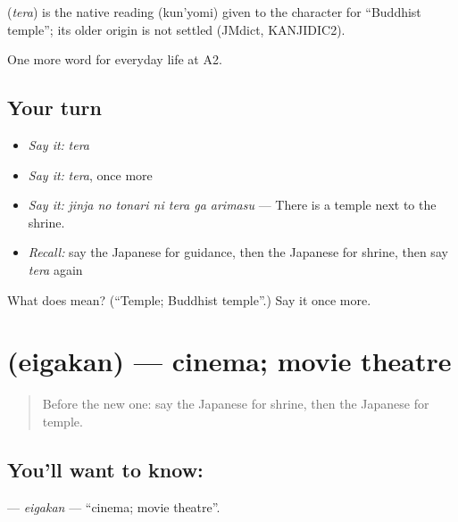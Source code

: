 \begin{cousinweb}
\textbf{} (\emph{tera}) is the native reading (kun'yomi) given to the character for \textquotedblleft{}Buddhist temple\textquotedblright{}; its older origin is not settled (JMdict, KANJIDIC2).
\end{cousinweb}

\begin{grammarlens}[title={What you've built}]
One more word for everyday life at A2.
\end{grammarlens}

\subsection*{Your turn}
\begin{itemize}
\raggedright
  \item \emph{Say it:} \emph{tera}
  \item \emph{Say it:} \emph{tera}, once more
  \item \emph{Say it:} \emph{jinja no tonari ni tera ga arimasu} — There is a temple next to the shrine.
  \item \emph{Recall:} say the Japanese for guidance, then the Japanese for shrine, then say \emph{tera} again
\end{itemize}

\begin{tcolorbox}[breakable,colback=teal!4,colframe=teal!35!black,title={Before you move on}]
What does  mean? (\textquotedblleft{}Temple; Buddhist temple\textquotedblright{}.) Say it once more.
\end{tcolorbox}
\section[\texorpdfstring{\ja{えいがかん} (eigakan)}{えいがかん (eigakan)}]{ (eigakan) — cinema; movie theatre}

\label{lesson:JA-C193-eigakan}



\begin{quote}
Before the new one: say the Japanese for shrine, then the Japanese for temple.
\end{quote}

\subsection*{You'll want to know: }
\textbf{} — \emph{eigakan} — \textquotedblleft{}cinema; movie theatre\textquotedblright{}.

